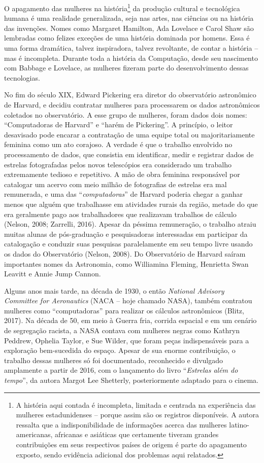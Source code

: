 O apagamento das mulheres na história\footnote{A história aqui contada é incompleta, limitada e centrada na experiência das mulheres estadunidenses – porque assim são os registros disponíveis. A autora ressalta que a indisponibilidade de informações acerca das mulheres latino-americanas, africanas e asiáticas que certamente tiveram grandes contribuições em seus respectivos países de origem é parte do apagamento exposto, sendo evidência adicional dos problemas aqui relatados.} da produção cultural e tecnológica humana é uma realidade generalizada, seja nas artes, nas ciências ou na história das invenções. Nomes como Margaret Hamilton, Ada Lovelace e Carol Shaw são lembradas como felizes exceções de uma história dominada por homens. Essa é uma forma dramática, talvez inspiradora, talvez revoltante, de contar a história – mas é incompleta. Durante toda a história da Computação, desde seu nascimento com Babbage e Lovelace, as mulheres fizeram parte do desenvolvimento dessas tecnologias. 

No fim do século XIX, Edward Pickering era diretor do observatório astronômico de Harvard, e decidiu contratar mulheres para processarem os dados astronômicos coletados no observatório. A esse grupo de mulheres, foram dados dois nomes: “Computadoras de Harvard” e “harém de Pickering”. A princípio, o leitor desavisado pode encarar a contratação de uma equipe total ou majoritariamente feminina como um ato corajoso. A verdade é que o trabalho envolvido no processamento de dados, que consistia em identificar, medir e registrar dados de estrelas fotografadas pelos novos telescópios era considerado um trabalho extremamente tedioso e repetitivo. A mão de obra feminina responsável por catalogar um acervo com meio milhão de fotografias de estrelas era mal remunerada, e uma das “\textit{computadoras}” de Harvard poderia chegar a ganhar menos que alguém que trabalhasse em atividades rurais da região, metade do que era geralmente pago aos trabalhadores que realizavam trabalhos de cálculo (Nelson, 2008; Zarrelli, 2016). Apesar da péssima remuneração, o trabalho atraiu muitas alunas de pós-graduação e pesquisadoras interessadas em participar da catalogação e conduzir suas pesquisas paralelamente em seu tempo livre usando os dados do Observatório (Nelson, 2008). Do Observatório de Harvard saíram importantes nomes da Astronomia, como Williamina Fleming, Henrietta Swan Leavitt e Annie Jump Cannon. 

Alguns anos mais tarde, na década de 1930, o então \textit{National Advisory Committee for Aeronautics} (NACA – hoje chamado NASA), também contratou mulheres como “computadoras” para realizar os cálculos astronômicos (Blitz, 2017). Na década de 50, em meio à Guerra fria, corrida espacial e em um cenário de segregação racista, a NASA contava com mulheres negras como Kathryn Peddrew, Ophelia Taylor, e Sue Wilder, que foram peças indispensáveis para a exploração bem-sucedida do espaço. Apesar de sua enorme contribuição, o trabalho dessas mulheres só foi documentado, reconhecido e divulgado amplamente a partir de 2016, com o lançamento do livro “\textit{Estrelas além do tempo}”, da autora Margot Lee Shetterly, posteriormente adaptado para o cinema.

